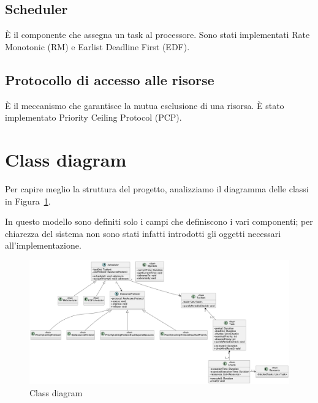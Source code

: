 \subsection{Scheduler}
È il componente che assegna un task al processore. Sono stati implementati Rate Monotonic (RM) e Earlist Deadline First (EDF).

\subsection{Protocollo di accesso alle risorse}
È il meccanismo che garantisce la mutua esclusione di una risorsa. È stato implementato Priority Ceiling Protocol (PCP).

\section{Class diagram}
Per capire meglio la struttura del progetto, analizziamo il diagramma delle classi in Figura~\ref{fig:classDiagram}.

In questo modello sono definiti solo i campi che definiscono i vari componenti; per chiarezza del sistema non sono stati infatti introdotti gli oggetti necessari all'implementazione.
\begin{figure}[htbp]
    \centering
    \includegraphics[width=1\textwidth]{immagini/class diagram.pdf}
    \caption{Class diagram}
    \label{fig:classDiagram}
\end{figure}